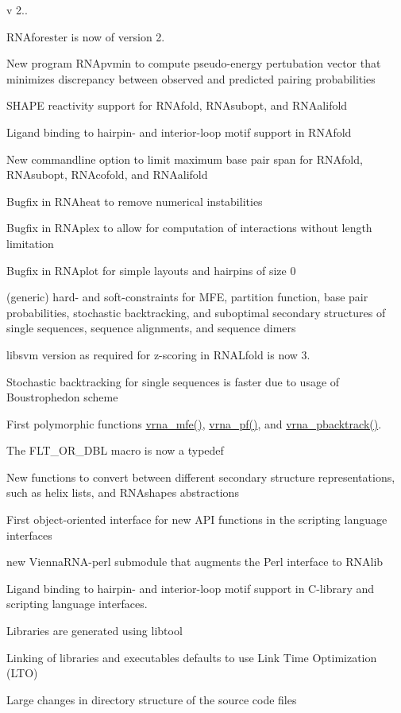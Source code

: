 v 2..
\begin{DoxyItemize}
\item R\+N\+Aforester is now of version 2.
\item New program R\+N\+Apvmin to compute pseudo-\/energy pertubation vector that minimizes discrepancy between observed and predicted pairing probabilities
\item S\+H\+A\+PE reactivity support for R\+N\+Afold, R\+N\+Asubopt, and R\+N\+Aalifold
\item Ligand binding to hairpin-\/ and interior-\/loop motif support in R\+N\+Afold
\item New commandline option to limit maximum base pair span for R\+N\+Afold, R\+N\+Asubopt, R\+N\+Acofold, and R\+N\+Aalifold
\item Bugfix in R\+N\+Aheat to remove numerical instabilities
\item Bugfix in R\+N\+Aplex to allow for computation of interactions without length limitation
\item Bugfix in R\+N\+Aplot for simple layouts and hairpins of size 0
\item (generic) hard-\/ and soft-\/constraints for M\+FE, partition function, base pair probabilities, stochastic backtracking, and suboptimal secondary structures of single sequences, sequence alignments, and sequence dimers
\item libsvm version as required for z-\/scoring in R\+N\+A\+Lfold is now 3.
\item Stochastic backtracking for single sequences is faster due to usage of Boustrophedon scheme
\item First polymorphic functions \mbox{\hyperlink{group__mfe__fold_gabd3b147371ccf25c577f88bbbaf159fd}{vrna\+\_\+mfe()}}, \mbox{\hyperlink{group__pf__fold_ga29e256d688ad221b78d37f427e0e99bc}{vrna\+\_\+pf()}}, and \mbox{\hyperlink{group__subopt__stochbt_ga901fe42a33b07be083421741bf7dc610}{vrna\+\_\+pbacktrack()}}.
\item The F\+L\+T\+\_\+\+O\+R\+\_\+\+D\+BL macro is now a typedef
\item New functions to convert between different secondary structure representations, such as helix lists, and R\+N\+Ashapes abstractions
\item First object-\/oriented interface for new A\+PI functions in the scripting language interfaces
\item new Vienna\+R\+N\+A-\/perl submodule that augments the Perl interface to R\+N\+Alib
\item Ligand binding to hairpin-\/ and interior-\/loop motif support in C-\/library and scripting language interfaces.
\item Libraries are generated using libtool
\item Linking of libraries and executables defaults to use Link Time Optimization (L\+TO)
\item Large changes in directory structure of the source code files
\end{DoxyItemize}

